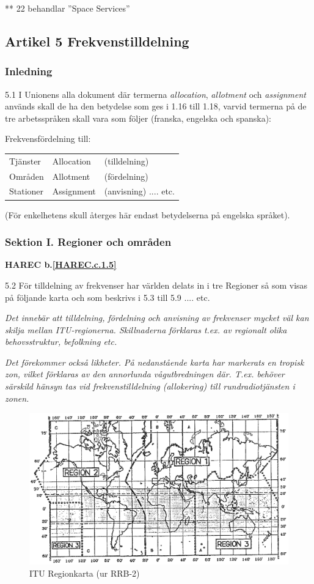 ** 22 behandlar ''Space Services''

\subsection{Artikel 5 Frekvenstilldelning}

\subsubsection{Inledning}

5.1 I Unionens alla dokument där termerna \emph{allocation},
\emph{allotment} och \emph{assignment} används skall de ha den
betydelse som ges i 1.16 till 1.18, varvid termerna på de tre
arbetsspråken skall vara som följer (franska, engelska och spanska):
\cite[5.1]{ITU-RR}

Frekvensfördelning till:
\begin{tabular}{lll}
  Tjänster & Allocation & (tilldelning) \\
  Områden & Allotment & (fördelning) \\
  Stationer & Assignment & (anvisning) .... etc. \\
\end{tabular}

(För enkelhetens skull återges här endast betydelserna på engelska språket).

\subsubsection{Sektion I. Regioner och områden}
\textbf{
HAREC b.\ref{HAREC.c.1.5}\label{myHAREC.c.1.5}
}

5.2 För tilldelning av frekvenser har världen delats in i tre
Regioner så som visas på följande karta och som beskrivs i 5.3 till
5.9 .... etc.
\cite[5.2]{ITU-RR}

\emph{ Det innebär att tilldelning, fördelning och anvisning av
  frekvenser mycket väl kan skilja mellan ITU-regionerna. Skillnaderna
  förklaras t.ex. av regionalt olika behovsstruktur, befolkning etc.}

\emph{Det förekommer också likheter. På nedanstående karta har
  markerats en tropisk zon, vilket förklaras av den annorlunda
  vågutbredningen där. T.ex. behöver särskild hänsyn tas vid
  frekvenstilldelning (allokering) till rundradiotjänsten i zonen.}

\begin{figure}
  \includegraphics[width=\textwidth]{images/bild_3_2-01.png}
  \caption{ITU Regionkarta (ur RRB-2)}
  \label{fig:bildIII2-1}
\end{figure}
